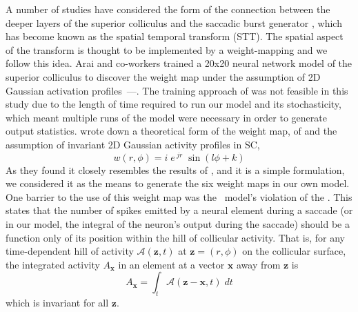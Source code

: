 \documentclass{frontiersSCNS}
\begin{document}
A number of studies have considered the form of the connection between
the deeper layers of the superior colliculus and the saccadic burst
generator \citep{van_gisbergen_experimental_1985,ottes_visuomotor_1986,waitzman_superior_1991,groh_converting_2001,arai_two-dimensional_1994,goossens_dynamic_2006,tabareau_geometry_2007,van_opstal_linear_2008,goossens_optimal_2012},
which has become known as the spatial temporal transform (STT).  The
spatial aspect of the transform is thought to be implemented by a
weight-mapping \citep{tabareau_geometry_2007,arai_two-dimensional_1994}
and we follow this idea.
%
Arai and co-workers trained a 20x20 neural network model of the
superior colliculus to discover the weight map under the assumption of
2D Gaussian activation
profiles~\citep{arai_two-dimensional_1994}---.
%
The training approach of \cite{arai_two-dimensional_1994} was not
feasible in this study due to the length of time required to run our
model and its stochasticity, which meant multiple runs of the model
were necessary in order to generate output statistics.
%
\cite{tabareau_geometry_2007} wrote down a theoretical form of the weight
map,  of \cite{ottes_visuomotor_1986}
and the assumption of invariant 2D Gaussian activity profiles in SC,
%
\begin{equation} \label{eq:tabareau_eq3}
w(r,\phi) = i\;e\,^{jr}\;\sin\left(l\phi + k\right)
\end{equation}
%
As they found it closely resembles the results
of \cite{arai_two-dimensional_1994}, and it is a simple formulation,
we considered it as the means to generate the six weight maps in our
own model.
%
One barrier to the use of this weight map was the \ccg~model's
violation of the
. This states that the number of spikes
emitted by a neural element during a saccade (or in our model, the
integral of the neuron's output during the saccade) should be a
function only of its position within the hill of collicular
activity. That is, for any time-dependent hill of activity
$\mathcal{A}(\mathbf{z},t)$ at $\mathbf{z} = (r,\phi)$ on the collicular
surface, the integrated activity  $A_{\mathbf{x}}$ in an element at a
vector $\mathbf{x}$ away from $\mathbf{z}$ is
\begin{equation}
A_{\mathbf{x}} = \int_t \mathcal{A}(\mathbf{z}-\mathbf{x}, t)\;dt
\end{equation}
which is invariant for all $\mathbf{z}$. 
\end{document}
